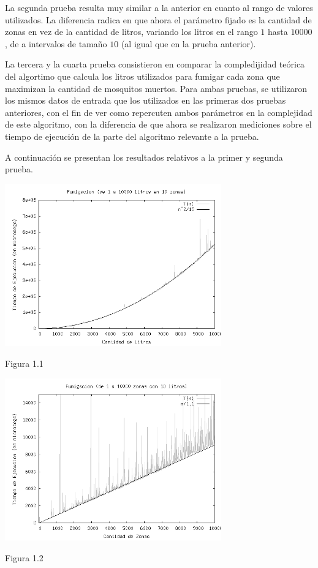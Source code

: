 \documentclass[a4paper,10pt] {article}
\begin{document}
La segunda prueba resulta muy similar a la anterior en cuanto al rango de valores utilizados. La diferencia radica en que ahora el parámetro fijado es la cantidad de zonas en vez de la cantidad de litros, variando los litros en el rango $1$ hasta $10000$, de a intervalos de tamaño $10$ (al igual que en la prueba anterior).

La tercera y la cuarta prueba consistieron en comparar la compledijidad teórica del algortimo que calcula los litros utilizados para fumigar cada zona que maximizan la cantidad de mosquitos muertos. Para ambas pruebas, se utilizaron los mismos datos de entrada que los utilizados en las primeras dos pruebas anteriores, con el fin de ver como repercuten ambos parámetros en la complejidad de este algoritmo, con la diferencia de que ahora se realizaron mediciones sobre el tiempo de ejecución de la parte del algoritmo relevante a la prueba.

A continuaci\'on se presentan los resultados relativos a la primer y segunda prueba.

\begin{center}
 \includegraphics[width=0.7\textwidth]{Plots/Tp2Ej1-TiemposFumigacionPorLitros-10zonas-bw.png}
\begin{center}
Figura 1.1
\end{center}
\includegraphics[width=0.7\textwidth]{Plots/Tp2Ej1-TiemposFumigacionPorZonas-10litros-bw.png}
\begin{center}
Figura 1.2
\end{center}
\end{center}
\end{document}
